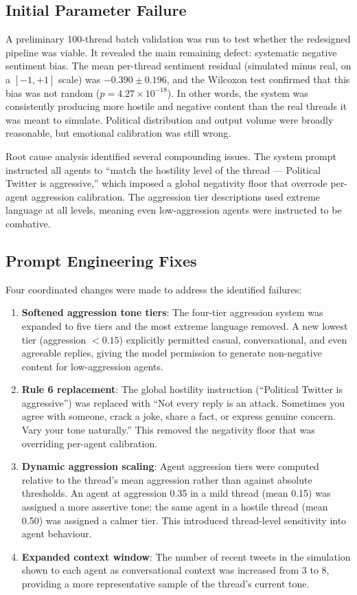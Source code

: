 \documentclass[logo,bsc,singlespacing,parskip,online]{infthesis}
\begin{document}
\subsection{Initial Parameter Failure}

A preliminary 100-thread batch validation was run to test whether the redesigned pipeline was viable. It revealed the main remaining defect: systematic negative sentiment bias. The mean per-thread sentiment residual (simulated minus real, on a $[-1, +1]$ scale) was $-0.390 \pm 0.196$, and the Wilcoxon test confirmed that this bias was not random ($p = 4.27 \times 10^{-18}$). In other words, the system was consistently producing more hostile and negative content than the real threads it was meant to simulate. Political distribution and output volume were broadly reasonable, but emotional calibration was still wrong.

Root cause analysis identified several compounding issues. The system prompt instructed all agents to ``match the hostility level of the thread --- Political Twitter is aggressive,'' which imposed a global negativity floor that overrode per-agent aggression calibration. The aggression tier descriptions used extreme language at all levels, meaning even low-aggression agents were instructed to be combative.

\subsection{Prompt Engineering Fixes}

Four coordinated changes were made to address the identified failures:

\begin{enumerate}
\item \textbf{Softened aggression tone tiers}: The four-tier aggression system was expanded to five tiers and the most extreme language removed. A new lowest tier (aggression $< 0.15$) explicitly permitted casual, conversational, and even agreeable replies, giving the model permission to generate non-negative content for low-aggression agents.
\item \textbf{Rule 6 replacement}: The global hostility instruction (``Political Twitter is aggressive'') was replaced with ``Not every reply is an attack. Sometimes you agree with someone, crack a joke, share a fact, or express genuine concern. Vary your tone naturally.'' This removed the negativity floor that was overriding per-agent calibration.
\item \textbf{Dynamic aggression scaling}: Agent aggression tiers were computed relative to the thread's mean aggression rather than against absolute thresholds. An agent at aggression 0.35 in a mild thread (mean 0.15) was assigned a more assertive tone; the same agent in a hostile thread (mean 0.50) was assigned a calmer tier. This introduced thread-level sensitivity into agent behaviour.
\item \textbf{Expanded context window}: The number of recent tweets in the simulation shown to each agent as conversational context was increased from 3 to 8, providing a more representative sample of the thread's current tone.
\end{enumerate}
\end{document}
